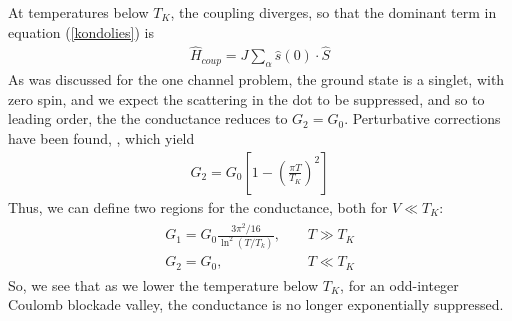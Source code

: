 \documentclass[11pt]{report}
\newcommand{\hH}{\hat{H}}
\begin{document}
At temperatures below $T_{K}$, the coupling diverges, so that the dominant term in equation (\ref{kondolies}) is
\begin{align}
  \hH_{coup}=J\sum_{\alpha}\hat{s}(0)\cdot\hat{S}
\end{align}
As was discussed for the one channel problem, the ground state is a singlet, with zero spin, and we expect the scattering in the dot to be suppressed, and so to leading order, the the conductance reduces to $G_{2}=G_{0}$.  Perturbative corrections have been found, \cite{3}, which yield
\begin{align}
  G_{2}=G_{0}\left[1-\left(\frac{\pi T}{T_{K}}\right)^{2}\right]
\end{align}
Thus, we can define two regions for the conductance, both for $V\ll T_{K}$:
\begin{align}
  \begin{array}{cc}
    G_{1}=G_{0}\frac{3\pi^{2}/16}{\ln^{2}(T/T_{k})}, & \;\;\;\;T\gg T_{K} \\
    G_{2}=G_{0}, & \;\;\;\;T\ll T_{K}
  \end{array}
\end{align}
So, we see that as we lower the temperature below $T_{K}$, for an odd-integer Coulomb blockade valley, the conductance is no longer exponentially suppressed.
\end{document}
